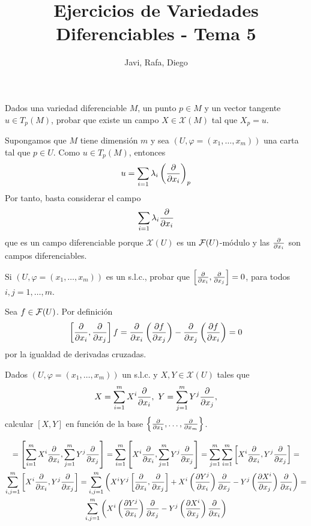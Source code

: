 \documentclass[twoside]{article}
\newcounter{ejercicio}
\begin{document}
\title{Ejercicios de Variedades Diferenciables - Tema 5}
\author{Javi, Rafa, Diego}
\maketitle

\begin{ejercicio}{1}
Dados una variedad diferenciable $M$, un punto $p\in M$ y un
vector tangente $u\in T_p(M)$, probar que existe un campo
$X\in\mathcal{X}(M)$ tal que $X_p=u$. 
\end{ejercicio}
\begin{solucion}
Supongamos que $M$ tiene dimensión $m$ y sea $(U,\varphi=(x_1,\dots,x_m))$ una carta tal que $p\in U$. Como $u\in T_p(M)$, entonces 
$$u=\sum_{i=1}\lambda_i\left(\frac{\partial }{\partial x_i}\right)_p$$
Por tanto, basta considerar el campo 
$$\sum_{i=1}\lambda_i\frac{\partial }{\partial x_i}$$
que es un campo diferenciable porque $\mathcal{X}(U)$ es un $\mathcal{F}(U)$-módulo y las $\frac{\partial }{\partial x_i}$ son campos diferenciables.
\end{solucion}

\newpage

\begin{ejercicio}{2}
Si $(U,\varphi=(x_1,\dots
,x_m))$ es un s.l.c., probar que
$\left[\frac{\partial }{\partial x_i},\frac{\partial }{\partial x_j}\right]=0$, para todos $i,j=1,\dots ,m$.
\end{ejercicio}
\begin{solucion}
Sea $f\in\mathcal{F}(U)$. Por definición 
$$\left[\frac{\partial }{\partial x_i},\frac{\partial }{\partial x_j}\right]f=\frac{\partial }{\partial x_i}\left(\frac{\partial f}{\partial x_j}\right)-\frac{\partial }{\partial x_j}\left(\frac{\partial f}{\partial x_i}\right)=0$$
por la igualdad de derivadas cruzadas. 
\end{solucion}

\newpage

\begin{ejercicio}{3}
Dados $(U,\varphi=(x_1,\dots ,x_m))$ un s.l.c. y
$X,Y\in\mathcal{X}(U)$ tales que
$$X=\sum_{i=1}^mX^i\frac{\partial }{\partial x_i},\mbox{ }Y=\sum_{j=1}^mY^j\frac{\partial }{\partial x_j},$$
calcular $[X,Y]$ en función de la base $\left\{\frac{\partial }{\partial x_1},\dots ,\frac{\partial }{\partial x_m}\right\}$.
\end{ejercicio}
\begin{solucion}
\begin{gather*}
[X,Y]=\left[\sum_{i=1}^mX^i\parcial{}{x_i},\sum_{j=1}^mY^j\parcial{}{x_j}\right]=\sum_{i=1}^m\left[X^i\parcial{}{x_i},\sum_{j=1}^mY^j\parcial{}{x_j}\right]=\sum_{j=1}^m\sum_{i=1}^m\left[X^i\parcial{}{x_i},Y^j\parcial{}{x_j}\right]=\\
\sum_{i,j=1}^m\left[X^i\parcial{}{x_i},Y^j\parcial{}{x_j}\right]=\sum_{i,j=1}^m \left(X^iY^j\left[\parcial{}{x_i},\parcial{}{x_j}\right]+X^i\left(\parcial{Y^j}{x_i}\right)\parcial{}{x_j}-Y^j\left(\parcial{X^i}{x_j}\right)\parcial{}{x_i}\right)=\\
\sum_{i,j=1}^m \left(X^i\left(\parcial{Y^j}{x_i}\right)\parcial{}{x_j}-Y^j\left(\parcial{X^i}{x_j}\right)\parcial{}{x_i}\right)
\end{gather*}
\end{solucion}
\end{document}
